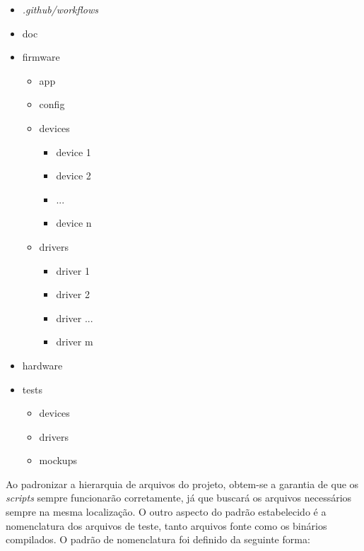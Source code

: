 \begin{itemize}
    
    \item \textit{.github/workflows}
    
    \item doc
    
    \item firmware
    
    \begin{itemize}
        \item app
    
        \item config
    
        \item devices
        \begin{itemize}
            \item device 1
            \item device 2
            \item ...
            \item device n
        \end{itemize}
    
        \item drivers
        \begin{itemize}
            \item driver 1
            \item driver 2
            \item driver ...
            \item driver m
        \end{itemize}
    
    \end{itemize}
    \item hardware
    
    \item tests
    \begin{itemize}
        \item devices
        \item drivers
        \item mockups\footnotemark{}
    \end{itemize}
    
\end{itemize}
Ao padronizar a hierarquia de arquivos do projeto, obtem-se a garantia de que os \textit{scripts} sempre funcionarão corretamente, já que buscará os arquivos necessários sempre na mesma localização.
O outro aspecto do padrão estabelecido é a nomenclatura dos arquivos de teste, tanto arquivos fonte como os binários compilados. O padrão de nomenclatura foi definido da seguinte forma:



